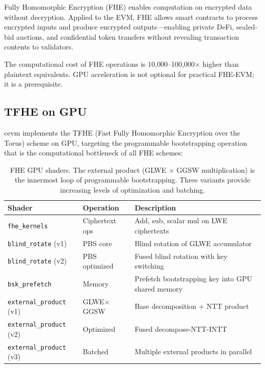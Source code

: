 \documentclass[11pt]{article}
\begin{document}
Fully Homomorphic Encryption (FHE) enables computation on encrypted data without
decryption. Applied to the EVM, FHE allows smart contracts to process encrypted inputs
and produce encrypted outputs---enabling private DeFi, sealed-bid auctions, and
confidential token transfers without revealing transaction contents to validators.

The computational cost of FHE operations is 10{,}000--100{,}000$\times$ higher than
plaintext equivalents. GPU acceleration is not optional for practical FHE-EVM; it is
a prerequisite.

\subsection{TFHE on GPU}

cevm implements the TFHE (Fast Fully Homomorphic Encryption over the Torus) scheme
on GPU, targeting the programmable bootstrapping operation that is the computational
bottleneck of all FHE schemes:

\begin{table}[h]
\centering
\small
\begin{tabular}{llp{5.5cm}}
\toprule
\textbf{Shader} & \textbf{Operation} & \textbf{Description} \\
\midrule
\texttt{fhe\_kernels}        & Ciphertext ops  & Add, sub, scalar mul on LWE ciphertexts \\
\texttt{blind\_rotate} (v1)  & PBS core        & Blind rotation of GLWE accumulator \\
\texttt{blind\_rotate} (v2)  & PBS optimized   & Fused blind rotation with key switching \\
\texttt{bsk\_prefetch}       & Memory          & Prefetch bootstrapping key into GPU shared memory \\
\texttt{external\_product} (v1) & GLWE$\times$GGSW & Base decomposition + NTT product \\
\texttt{external\_product} (v2) & Optimized       & Fused decompose-NTT-INTT \\
\texttt{external\_product} (v3) & Batched         & Multiple external products in parallel \\
\bottomrule
\end{tabular}
\caption{FHE GPU shaders. The external product (GLWE $\times$ GGSW multiplication)
is the innermost loop of programmable bootstrapping. Three variants provide
increasing levels of optimization and batching.}
\label{tab:fhe}
\end{table}
\end{document}
